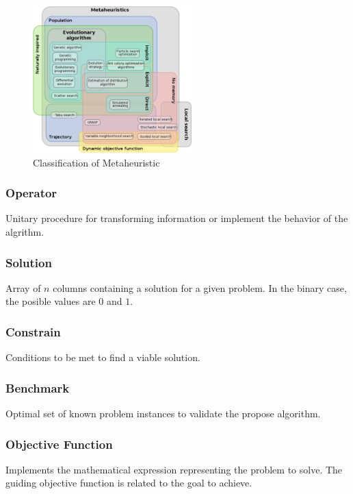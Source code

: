 \squeezeup


\begin{figure}[ht]
	\centering
  \includegraphics[width=0.55\textwidth]{MarcoConceptual/images/classification_mh.png}
	\caption{Classification of Metaheuristic}\label{fig:classification-of-mh}
\end{figure}

\squeezeup


\subsubsection{Operator} 
Unitary procedure for transforming information or implement the behavior of the algrithm.

\subsubsection{Solution} 
Array of $n$ columns containing a solution for a given problem. In the binary case, the posible values are $0$ and $1$.

\subsubsection{Constrain} 
Conditions to be met to find a viable solution.

\subsubsection{Benchmark} 
Optimal set of known problem instances to validate the propose algorithm.

\subsubsection{Objective Function}  
Implements the mathematical expression representing the problem to solve. The guiding objective function is related to the goal to achieve.

